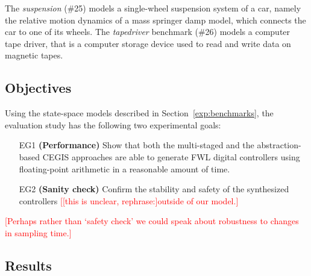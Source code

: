 \documentclass[twocolumn]{autart}    %
\renewcommand{\note}[1]{\textcolor{red}{[#1]}}
\begin{document}
The \textit{suspension} (\#25) models a single-wheel suspension system of a car, 
namely the relative motion dynamics of a mass springer damp model, which connects the car to one of its wheels.  
The \textit{tapedriver} benchmark (\#26) models a computer tape driver, 
that is a computer storage device used to read and write data on magnetic tapes. 


 
\subsection{Objectives}
\label{exp:objectives}

Using the state-space models described in Section~\ref{exp:benchmarks}, 
the evaluation study has the following two experimental goals: 

\begin{enumerate}

\item[EG1] \textbf{(Performance)} Show that both the multi-staged and the abstraction-based
CEGIS approaches are able to generate FWL digital controllers using floating-point arithmetic 
in a reasonable amount of time.

\item[EG2] \textbf{(Sanity check)} Confirm the
stability and safety of the synthesized controllers \note{[this is unclear, rephrase:]outside of our model.} 

\end{enumerate}

\note{Perhaps rather than `safety check' we could speak about robustness to changes in sampling time.}

\subsection{Results}
\label{exp:results}
\end{document}
